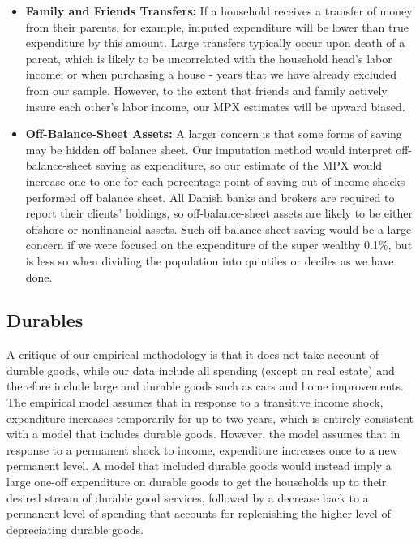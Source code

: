 \documentclass[titlepage]{\econtex}\newcommand{\texname}{ConsumptionHeterogeneity}
\begin{document}
\begin{itemize}
	\item \textbf{Family and Friends Transfers:} If a household receives a transfer of money from their parents, for example, imputed expenditure will be lower than true expenditure by this amount. Large transfers typically occur upon death of a parent, which is likely to be uncorrelated with the household head's labor income, or when purchasing a house - years that we have already excluded from our sample. However, to the extent that friends and family actively insure each other's labor income, our MPX estimates will be upward biased.
	\item \textbf{Off-Balance-Sheet Assets:} A larger concern is that some forms of saving may be hidden off balance sheet. Our imputation method would interpret off-balance-sheet saving as expenditure, so our estimate of the MPX would increase one-to-one for each percentage point of saving out of income shocks performed off balance sheet. All Danish banks and brokers are required to report their clients' holdings, so off-balance-sheet assets are likely to be either offshore or nonfinancial assets. Such off-balance-sheet saving would be a large concern if we were focused on the expenditure of the super wealthy 0.1\%, but is less so when dividing the population into quintiles or deciles as we have done. 
\end{itemize}

\subsection{Durables} \label{durables}
A critique of our empirical methodology is that it does not take account of durable goods, while our data include all spending (except on real estate) and therefore include large and durable goods such as cars and home improvements. The empirical model assumes that in response to a transitive income shock, expenditure increases temporarily for up to two years, which is entirely consistent with a model that includes durable goods. However, the model assumes that in response to a permanent shock to income, expenditure increases once to a new permanent level. A model that included durable goods would instead imply a large one-off expenditure on durable goods to get the households up to their desired stream of durable good services, followed by a decrease back to a permanent level of spending that accounts for replenishing the higher level of depreciating durable goods.
\end{document}

